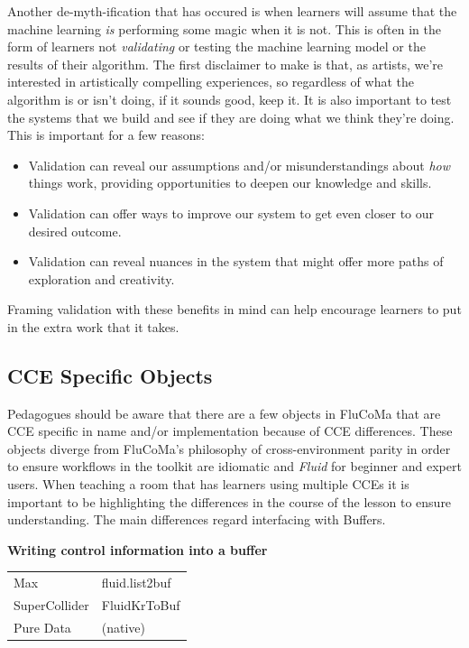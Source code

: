 \documentclass{article}
\providecommand{\tightlist}{%
  \setlength{\itemsep}{0pt}\setlength{\parskip}{0pt}}
\begin{document}
Another de-myth-ification that has occured is when learners will assume
that the machine learning \emph{is} performing some magic when it is not. This is often
in the form of learners not \emph{validating} or testing the machine
learning model or the results of their algorithm. The first disclaimer
to make is that, as artists, we're interested in artistically compelling
experiences, so regardless of what the algorithm is or isn't doing, if
it sounds good, keep it. It is also important to test the systems that
we build and see if they are doing what we think they're doing. This is
important for a few reasons:

\begin{itemize}
\tightlist
\item
  Validation can reveal our assumptions and/or misunderstandings about
  \emph{how} things work, providing opportunities to deepen our
  knowledge and skills.
\item
  Validation can offer ways to improve our system to get even closer to our
  desired outcome.
\item
  Validation can reveal nuances in the system that might offer more paths of
  exploration and creativity.
\end{itemize}

Framing validation with these benefits in mind can help encourage
learners to put in the extra work that it takes.

\subsection{CCE Specific Objects}\label{cce-specific-objects}

Pedagogues should be aware that there are a few objects in FluCoMa that
are CCE specific in name and/or implementation because of CCE
differences. These objects diverge from FluCoMa's philosophy of
cross-environment parity in order to ensure workflows in the toolkit are
idiomatic and \emph{Fluid} for beginner and expert users. When teaching a room that has learners using multiple CCEs it is important to be highlighting the differences in the course of the lesson to ensure understanding. The main differences regard interfacing with Buffers.

\textbf{Writing control information into a buffer}

\begin{longtable}{ll}
\toprule
Max & fluid.list2buf \\
SuperCollider & FluidKrToBuf \\
Pure Data & (native) \\
\bottomrule
\end{longtable}
\end{document}
